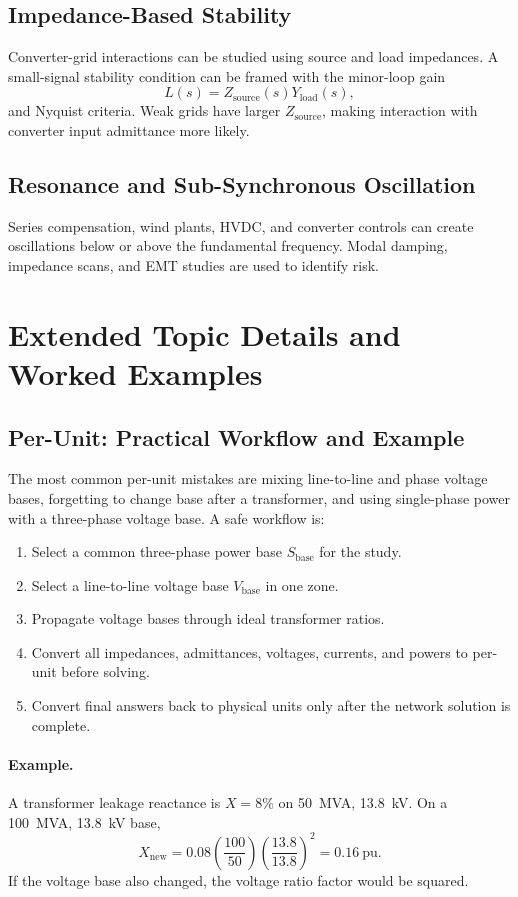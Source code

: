 \documentclass[11pt]{article}
\newcommand{\Sbase}{S_{\mathrm{base}}}
\newcommand{\Vbase}{V_{\mathrm{base}}}
\newcommand{\pu}{\mathrm{pu}}
\begin{document}
\subsection{Impedance-Based Stability}
Converter-grid interactions can be studied using source and load impedances. A
small-signal stability condition can be framed with the minor-loop gain
\begin{equation}
L(s)=Z_{\mathrm{source}}(s)Y_{\mathrm{load}}(s),
\end{equation}
and Nyquist criteria. Weak grids have larger $Z_{\mathrm{source}}$, making
interaction with converter input admittance more likely.

\subsection{Resonance and Sub-Synchronous Oscillation}
Series compensation, wind plants, HVDC, and converter controls can create
oscillations below or above the fundamental frequency. Modal damping,
impedance scans, and EMT studies are used to identify risk.

\section{Extended Topic Details and Worked Examples}

\subsection{Per-Unit: Practical Workflow and Example}
The most common per-unit mistakes are mixing line-to-line and phase voltage
bases, forgetting to change base after a transformer, and using single-phase
power with a three-phase voltage base. A safe workflow is:
\begin{enumerate}
  \item Select a common three-phase power base $\Sbase$ for the study.
  \item Select a line-to-line voltage base $\Vbase$ in one zone.
  \item Propagate voltage bases through ideal transformer ratios.
  \item Convert all impedances, admittances, voltages, currents, and powers to
  per-unit before solving.
  \item Convert final answers back to physical units only after the network
  solution is complete.
\end{enumerate}

\paragraph{Example.}
A transformer leakage reactance is $X=8\%$ on \SI{50}{MVA},
\SI{13.8}{kV}. On a \SI{100}{MVA}, \SI{13.8}{kV} base,
\begin{equation}
X_{\mathrm{new}}=0.08
\left(\frac{100}{50}\right)
\left(\frac{13.8}{13.8}\right)^2=0.16\ \pu.
\end{equation}
If the voltage base also changed, the voltage ratio factor would be squared.
\end{document}
